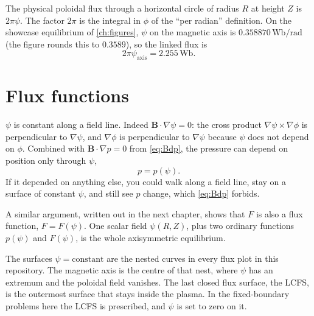 \documentclass[11pt,a4paper,oneside,openany]{book}
\numberwithin{equation}{chapter}
\newcommand{\grad}{\nabla}
\theoremstyle{definition}
\begin{document}
The physical poloidal flux through a horizontal circle of radius \(R\) at height \(Z\) is \(2\pi\psi\). The factor \(2\pi\) is the integral in \(\phi\) of the ``per radian'' definition. On the showcase equilibrium of \cref{ch:figures}, \(\psi\) on the magnetic axis is \(0.358870\,\mathrm{Wb/rad}\) (the figure rounds this to \(0.3589\)), so the linked flux is
\begin{equation}
\label{eq:linked}
2\pi\psi_{\mathrm{axis}}=2.255\,\mathrm{Wb}.
\end{equation}

\section{Flux functions}

\(\psi\) is constant along a field line. Indeed \(\mathbf{B}\cdot\grad\psi=0\): the cross product \(\grad\psi\times\grad\phi\) is perpendicular to \(\grad\psi\), and \(\grad\phi\) is perpendicular to \(\grad\psi\) because \(\psi\) does not depend on \(\phi\). Combined with \(\mathbf{B}\cdot\grad p=0\) from \eqref{eq:Bdp}, the pressure can depend on position only through \(\psi\),
\begin{equation}
\label{eq:ppsi}
p=p(\psi).
\end{equation}
If it depended on anything else, you could walk along a field line, stay on a surface of constant \(\psi\), and still see \(p\) change, which \eqref{eq:Bdp} forbids.

A similar argument, written out in the next chapter, shows that \(F\) is also a flux function, \(F=F(\psi)\). One scalar field \(\psi(R,Z)\), plus two ordinary functions \(p(\psi)\) and \(F(\psi)\), is the whole axisymmetric equilibrium.

The surfaces \(\psi=\mathrm{constant}\) are the nested curves in every flux plot in this repository. The magnetic axis is the centre of that nest, where \(\psi\) has an extremum and the poloidal field vanishes. The last closed flux surface, the LCFS, is the outermost surface that stays inside the plasma. In the fixed-boundary problems here the LCFS is prescribed, and \(\psi\) is set to zero on it.
\end{document}
